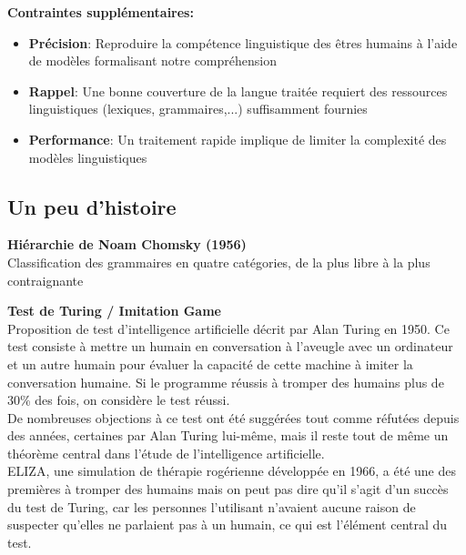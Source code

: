 \noindent\textbf{Contraintes supplémentaires:}

\begin{itemize}
    \item \textbf{Précision}: Reproduire la compétence linguistique des êtres humains à l'aide de modèles
    formalisant notre compréhension
    \item \textbf{Rappel}: Une bonne couverture de la langue traitée requiert des ressources
    linguistiques (lexiques, grammaires,...) suffisamment fournies
    \item \textbf{Performance}: Un traitement rapide implique de limiter la complexité des modèles linguistiques
\end{itemize}

\subsection{Un peu d'histoire}

\textbf{Hiérarchie de Noam Chomsky (1956)} \\

Classification des grammaires en quatre catégories, de la plus libre à la plus contraignante

\vspace{1cm}

\resizebox{0.9\textwidth}{!}{
    
}

\newpage

\textbf{Test de Turing / Imitation Game} \\

Proposition de test d’intelligence artificielle décrit par Alan Turing en 1950. Ce test consiste à mettre un humain en conversation à l’aveugle avec un ordinateur et un autre humain pour évaluer la capacité de cette machine à imiter la conversation humaine. Si le programme réussis à tromper des humains plus de 30\% des fois, on considère le test réussi. \\

De nombreuses objections à ce test ont été suggérées tout comme réfutées depuis des années, certaines par Alan Turing lui-même, mais il reste tout de même un théorème central dans l'étude de l'intelligence artificielle. \\

ELIZA, une simulation de thérapie rogérienne développée en 1966, a été une des premières à tromper des humains mais on peut pas dire qu'il s'agit d'un succès du test de Turing, car les personnes l'utilisant n'avaient aucune raison de suspecter qu'elles ne parlaient pas à un humain, ce qui est l'élément central du test. \\

